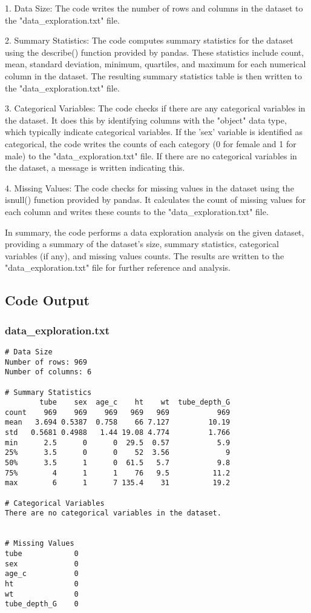 \documentclass[11pt]{article}
\begin{document}
1. Data Size: The code writes the number of rows and columns in the dataset to the "data\_exploration.txt" file.

2. Summary Statistics: The code computes summary statistics for the dataset using the describe() function provided by pandas. These statistics include count, mean, standard deviation, minimum, quartiles, and maximum for each numerical column in the dataset. The resulting summary statistics table is then written to the "data\_exploration.txt" file.

3. Categorical Variables: The code checks if there are any categorical variables in the dataset. It does this by identifying columns with the "object" data type, which typically indicate categorical variables. If the 'sex' variable is identified as categorical, the code writes the counts of each category (0 for female and 1 for male) to the "data\_exploration.txt" file. If there are no categorical variables in the dataset, a message is written indicating this.

4. Missing Values: The code checks for missing values in the dataset using the isnull() function provided by pandas. It calculates the count of missing values for each column and writes these counts to the "data\_exploration.txt" file.

In summary, the code performs a data exploration analysis on the given dataset, providing a summary of the dataset's size, summary statistics, categorical variables (if any), and missing values counts. The results are written to the "data\_exploration.txt" file for further reference and analysis.

\subsection{Code Output}

\subsubsection*{data\_exploration.txt}

\begin{Verbatim}[tabsize=4]
# Data Size
Number of rows: 969
Number of columns: 6

# Summary Statistics
        tube    sex  age_c    ht    wt  tube_depth_G
count    969    969    969   969   969           969
mean   3.694 0.5387  0.758    66 7.127         10.19
std   0.5681 0.4988   1.44 19.08 4.774         1.766
min      2.5      0      0  29.5  0.57           5.9
25%      3.5      0      0    52  3.56             9
50%      3.5      1      0  61.5   5.7           9.8
75%        4      1      1    76   9.5          11.2
max        6      1      7 135.4    31          19.2

# Categorical Variables
There are no categorical variables in the dataset.


# Missing Values
tube            0
sex             0
age_c           0
ht              0
wt              0
tube_depth_G    0

\end{Verbatim}
\end{document}
